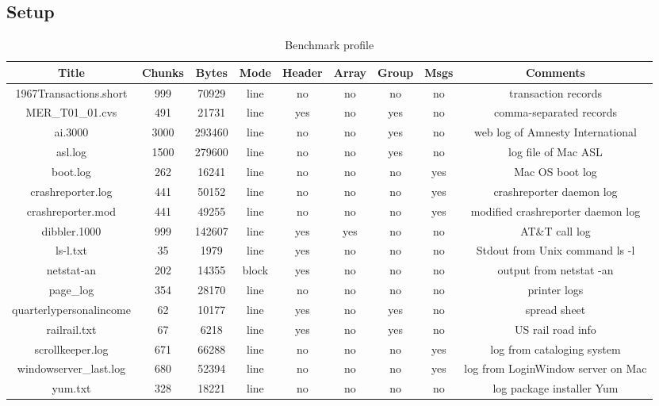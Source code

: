 \subsection{Setup}
\begin{table*}
\begin{center}
\begin{tabular}{|c|c|c|c|c|c|c|c|c|} \hline
Title		& Chunks & Bytes	& Mode  &Header	& Array	& Group & Msgs 	& Comments \\ \hline \hline
1967Transactions.short	& 999	& 70929	& line	& no	& no	& no	& no	& transaction records \\ \hline
MER\_T01\_01.cvs	& 491	& 21731 & line  & yes	& no	& yes	& no	& comma-separated records\\ \hline
ai.3000		& 3000		& 293460 & line	& no	& no	& yes	& no	& web log of Amnesty International \\ \hline
asl.log &	1500	& 279600	& line	& no	& no	& yes	& no	& log file of Mac ASL \\ \hline	
boot.log	& 262	& 16241		& line	& no	& no	& no	& yes	& Mac OS boot log \\ \hline
crashreporter.log	& 441	& 50152 & line	& no	& no	& no	& yes	& crashreporter daemon log \\ \hline
crashreporter.mod & 441	& 49255	& line	& no	& no	& no	& yes	& modified crashreporter daemon log \\ \hline
dibbler.1000	& 999	& 142607 	& line	& yes	& yes	& no	& no	& AT\&T call log \\ \hline
ls-l.txt	& 35	& 1979		& line	& yes	& no	& no	& no	& Stdout from Unix command ls -l \\ \hline
netstat-an	& 202	& 14355		& block	& yes	& no	& no	& no	& output from netstat -an \\ \hline
page\_log	& 354	& 28170		& line	& no	& no	& no	& no	& printer logs \\ \hline
quarterlypersonalincome & 62	& 10177	& line	& yes	& no	& yes	& no	& spread sheet \\ \hline
railrail.txt	& 67	& 6218		& line	& yes	& no	& yes	& no	& US rail road info \\ \hline
scrollkeeper.log & 671	& 66288		& line	& no	& no	& no	& yes	& log from cataloging system \\ \hline
windowserver\_last.log & 680	& 52394	& line	& no	& no	& no	& yes	& log from LoginWindow server on Mac \\ \hline
yum.txt		& 328	& 18221		& line	& no	& no	& no	& no	& log package installer Yum \\ \hline
\end{tabular}
\caption{Benchmark profile}
\end{center}
\end{table*}

